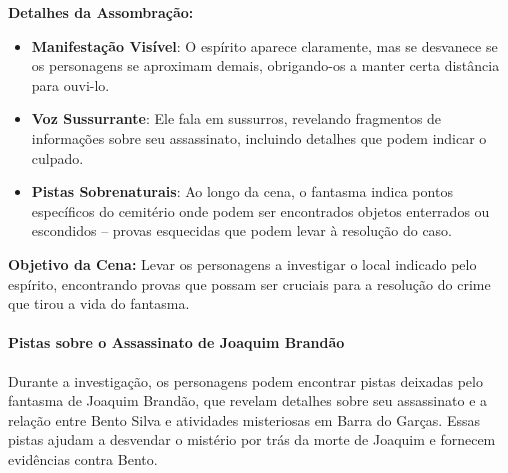 \textbf{Detalhes da Assombração:}
\begin{itemize}
    \item \textbf{Manifestação Visível}: O espírito aparece claramente, mas se desvanece se os personagens se aproximam demais, obrigando-os a manter certa distância para ouvi-lo.
    \item \textbf{Voz Sussurrante}: Ele fala em sussurros, revelando fragmentos de informações sobre seu assassinato, incluindo detalhes que podem indicar o culpado.
    \item \textbf{Pistas Sobrenaturais}: Ao longo da cena, o fantasma indica pontos específicos do cemitério onde podem ser encontrados objetos enterrados ou escondidos – provas esquecidas que podem levar à resolução do caso.
\end{itemize}



\textbf{Objetivo da Cena:} Levar os personagens a investigar o local indicado pelo espírito, encontrando provas que possam ser cruciais para a resolução do crime que tirou a vida do fantasma.

\paragraph{Pistas sobre o Assassinato de Joaquim Brandão}

Durante a investigação, os personagens podem encontrar pistas deixadas pelo fantasma de Joaquim Brandão, que revelam detalhes sobre seu assassinato e a relação entre Bento Silva e atividades misteriosas em Barra do Garças. Essas pistas ajudam a desvendar o mistério por trás da morte de Joaquim e fornecem evidências contra Bento.

